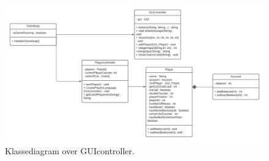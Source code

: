 \begin{flushleft}
\begin{figure}[H]
    \includegraphics[width=15cm]{Report/figures/Klassediagram/player_GUIController_klassediagram.png}
    \caption{Klassediagram over GUIcontroller.}
    \label{Klasse_GUIController}
\end{figure}


\end{flushleft}